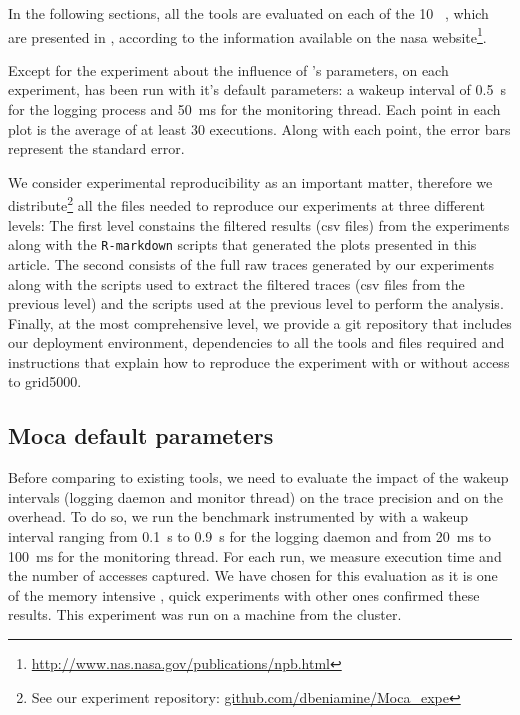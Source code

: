 In the following sections, all the tools are
evaluated on each of the 10 \NPB~\cite{Jin1999}, which are
presented in , according to the information available on the nasa
website\footnote{\url{http://www.nas.nasa.gov/publications/npb.html}}.

Except for the experiment about the influence of \Moca's parameters, on each
experiment, \Moca has been run with it's default parameters: a wakeup interval of
\SI{0.5}{s} for the logging process and \SI{50}{ms} for the monitoring thread.
Each point in each plot is the average of at least $30$ executions. Along with each point,
the error bars represent the standard error.

We consider experimental reproducibility as an important matter, therefore we
distribute\footnote{See our experiment repository:
    \href{https://github.com/dbeniamine/Moca_expe}{github.com/dbeniamine/Moca\_expe}}
all the files needed to reproduce our experiments at three different levels:
The first level constains the filtered results (csv files) from the
experiments along with the \texttt{R-markdown} scripts that generated the
plots presented in this article.
The second consists of the full raw traces generated by our experiments along
with the scripts used to extract the filtered traces (csv files from the
previous level) and the scripts used at the previous level to perform the
analysis.
Finally, at the most comprehensive level, we provide a git repository that
includes our deployment environment, dependencies to all the tools and files
required and instructions that explain how to reproduce the experiment with or
without access to grid5000.


\subsection{Moca default parameters}
\label{sec:expe-param}

Before comparing \Moca to existing tools, we need to evaluate the impact of
the wakeup intervals (logging daemon and monitor thread) on the trace
precision and on the overhead. To do so, we run the \IS benchmark instrumented by \Moca with
a wakeup interval ranging from \SI{0.1}{s} to  \SI{0.9}{s} for the logging daemon and from \SI{20}{ms} to
\SI{100}{ms} for the monitoring thread. For each run, we measure \IS execution time and the number of
accesses captured. We have chosen \IS for this evaluation as it is one of the memory intensive \NPB,
quick experiments with other ones confirmed these results. This experiment was
run on a machine from the \Edel cluster.

